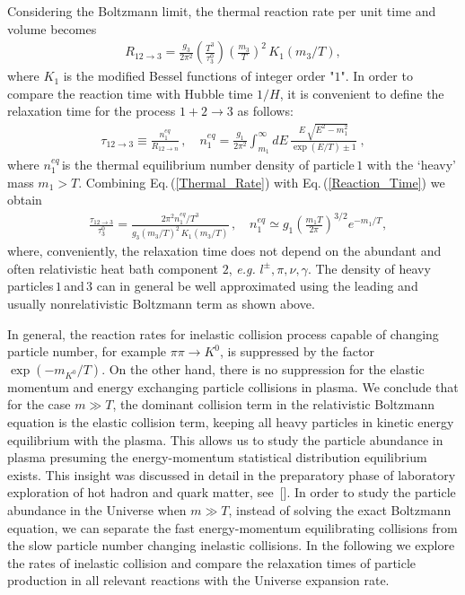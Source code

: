 Considering the Boltzmann limit, the thermal reaction rate per unit time and volume becomes
\begin{align}
\label{Thermal_Rate}
R_{12\rightarrow3}=\frac{g_3}{2\pi^2}\left(\frac{T^3}{\tau^0_3}\right)\left(\frac{m_3}{T}\right)^2\,K_1(m_3/T),
\end{align}
where $K_1$ is the modified Bessel functions of integer order "$1$". In order to compare the reaction time with Hubble time $1/H$, it is convenient to define the relaxation time for the process $1+2\rightarrow 3$ as follows:
\begin{align}
\label{Reaction_Time}
\tau_{12\rightarrow 3}\equiv\frac{n^{eq}_{1}}{R_{12\rightarrow n}}\,,\quad
n^{eq}_1=\frac{g_1}{2\pi^2}\int_{m_1}^\infty\!\!\!\!dE\,\frac{E\,\sqrt{E^2-m_1^2}}{\exp{\left(E/T\right)}\pm1}\;, 
\end{align}
where $n^{eq}_1$\,is the thermal equilibrium number density of particle\,$1$ with the `heavy' mass $m_1>T$.  Combining Eq.\,(\ref{Thermal_Rate}) with  Eq.\,(\ref{Reaction_Time}) we obtain
\begin{align}\label{RelaxationTime}
&\frac{\tau_{12\rightarrow3}}{ \tau^0_3}=  
\frac{2\pi^2 n^{eq}_1/T^3}{g_3(m_3/T)^2\,K_1(m_3/T)}\,, \quad 
n^{eq}_1\simeq g_1\left(\frac{m_1 T}{2\pi}\right)^{3/2}e^{-m_1/T},
\end{align}
where, conveniently, the relaxation time does not depend on the abundant and often relativistic heat bath component $2$, {\it e.g.\/} $l^\pm,\pi,\nu,\gamma$. The density of heavy particles\,$1$\,and\,$3$ can in general be well approximated using the leading and usually nonrelativistic Boltzmann term as shown above.

In general, the reaction rates for inelastic collision process capable of changing particle number, for example $\pi\pi\to K^0$, is suppressed by the factor $\exp{(-m_{K^0}/T)}$. On the other hand, there is no suppression for the elastic momentum and energy exchanging particle collisions in plasma. We conclude that for the case $m\gg T$, the dominant collision term in the relativistic Boltzmann equation is the elastic collision term, keeping all heavy particles in kinetic energy equilibrium with the plasma. This allows us to study the particle abundance in plasma presuming the energy-momentum statistical distribution equilibrium exists. This insight was discussed in detail in the preparatory phase of laboratory exploration of hot hadron and quark matter, see~[\cite{Koch:1986ud}]. In order to study the particle abundance in the Universe when $m\gg T$, instead of solving the exact Boltzmann equation, we can separate the fast energy-momentum equilibrating collisions from the slow particle number changing inelastic collisions. In the following we explore the rates of inelastic collision and compare the relaxation times of particle production in all relevant reactions with the Universe expansion rate.



